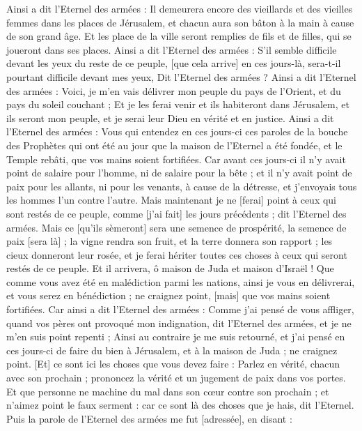 \begin{multicols}{2}
Ainsi a dit l'Eternel des armées : Il demeurera encore des vieillards et des vieilles femmes dans les places de Jérusalem, et chacun aura son bâton à la main à cause de son grand âge.
Et les place de la ville seront remplies de fils et de filles, qui se joueront dans ses places.
Ainsi a dit l'Eternel des armées : S'il semble difficile devant les yeux du reste de ce peuple, [que cela arrive] en ces jours-là, sera-t-il pourtant difficile devant mes yeux, Dit l'Eternel des armées ?
Ainsi a dit l'Eternel des armées : Voici, je m'en vais délivrer mon peuple du pays de l'Orient, et du pays du soleil couchant ;
Et je les ferai venir et ils habiteront dans Jérusalem, et ils seront mon peuple, et je serai leur Dieu en vérité et en justice.
Ainsi a dit l'Eternel des armées : Vous qui entendez en ces jours-ci ces paroles de la bouche des Prophètes qui ont été au jour que la maison de l'Eternel a été fondée, et le Temple rebâti, que vos mains soient fortifiées.
Car avant ces jours-ci il n'y avait point de salaire pour l'homme, ni de salaire pour la bête ; et il n'y avait point de paix pour les allants, ni pour les venants, à cause de la détresse, et j'envoyais tous les hommes l'un contre l'autre.
Mais maintenant je ne [ferai] point à ceux qui sont restés de ce peuple, comme [j'ai fait] les jours précédents ; dit l'Eternel des armées.
Mais ce [qu'ils sèmeront] sera une semence de prospérité, la semence de paix [sera là] ; la vigne rendra son fruit, et la terre donnera son rapport ; les cieux donneront leur rosée, et je ferai hériter toutes ces choses à ceux qui seront restés de ce peuple.
Et il arrivera, ô maison de Juda et maison d'Israël ! Que comme vous avez été en malédiction parmi les nations, ainsi je vous en délivrerai, et vous serez en bénédiction ; ne craignez point, [mais] que vos mains soient fortifiées.
Car ainsi a dit l'Eternel des armées : Comme j'ai pensé de vous affliger, quand vos pères ont provoqué mon indignation, dit l'Eternel des armées, et je ne m'en suis point repenti ;
Ainsi au contraire je me suis retourné, et j'ai pensé en ces jours-ci de faire du bien à Jérusalem, et à la maison de Juda ; ne craignez point.
[Et] ce sont ici les choses que vous devez faire : Parlez en vérité, chacun avec son prochain ; prononcez la vérité et un jugement de paix dans vos portes.
Et que personne ne machine du mal dans son cœur contre son prochain ; et n'aimez point le faux serment : car ce sont là des choses que je hais, dit l'Eternel.
Puis la parole de l'Eternel des armées me fut [adressée], en disant :

\end{multicols}

